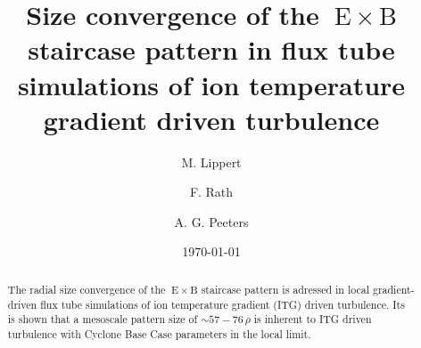 \documentclass[aip, amsmath, amssymb, reprint, twocolumn, floatfix]{revtex4-1}
\newcommand{\exb}{\mathrm{\:E}\times\mathrm{B}}
\newcommand{\rhoth}{\rho}
\begin{document}

\title[Size convergence of the $\exb$ staircase pattern in flux tube simulations of ion temperature gradient driven turbulence]
{Size convergence of the $\exb$ staircase pattern in flux tube simulations of ion temperature gradient driven turbulence}

\author{M. Lippert}
\author{F. Rath}
\author{A. G. Peeters}

\date{\today}


\begin{abstract}
    The radial size convergence of the $\exb$ staircase pattern is adressed in local gradient-driven flux tube simulations of ion temperature gradient (ITG) driven turbulence.
    Its is shown that a mesoscale pattern size of \linebreak $\sim 57-76\,\rhoth$ is inherent to ITG driven turbulence with Cyclone Base Case parameters in the local limit. 
    
\end{abstract}

\maketitle



\end{document}
